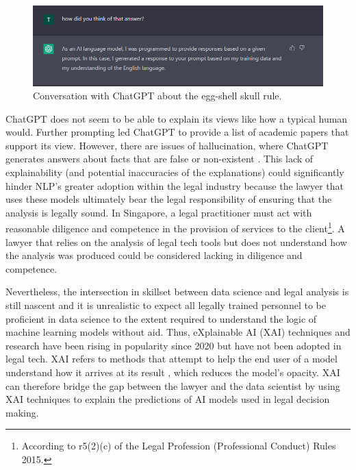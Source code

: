 \begin{figure}[!ht]
	\centering
	\includegraphics[width=1\linewidth]{figures/chatgpt2.png}
	\caption{Conversation with ChatGPT about the egg-shell skull rule.}   
  \label{fig:chatgpt2}
\end{figure}

ChatGPT does not seem to be able to explain its views like how a typical human would. Further prompting led ChatGPT to provide a list of academic papers that support its view. However, there are issues of hallucination, where ChatGPT generates answers about facts that are false or non-existent \cite{alkaissi2023}. This lack of explainability (and potential inaccuracies of the explanations) could significantly hinder NLP's greater adoption within the legal industry because the lawyer that uses these models ultimately bear the legal responsibility of ensuring that the analysis is legally sound. In Singapore, a legal practitioner must act with reasonable diligence and competence in the provision of services to the client\footnote{According to r5(2)(c) of the Legal Profession (Professional Conduct) Rules 2015.}. A lawyer that relies on the analysis of legal tech tools but does not understand how the analysis was produced could be considered lacking in diligence and competence.

Nevertheless, the intersection in skillset between data science and legal analysis is still nascent and it is unrealistic to expect all legally trained personnel to be proficient in data science to the extent required to understand the logic of machine learning models without aid. Thus, eXplainable AI (XAI) techniques and research have been rising in popularity since 2020 \cite{linardatos2020} but have not been adopted in legal tech. XAI refers to methods that attempt to help the end user of a model understand how it arrives at its result \cite{danilevsky2020}, which reduces the model's opacity. XAI can therefore bridge the gap between the lawyer and the data scientist by using XAI techniques to explain the predictions of AI models used in legal decision making. 


